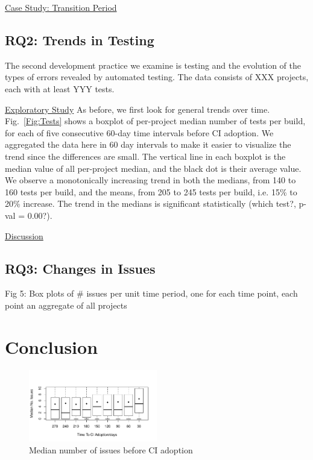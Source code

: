 \documentclass[conference]{IEEEtran}
\begin{document}
\noindent \underline{Case Study: Transition Period}

\subsection{RQ2: Trends in Testing}

The second development practice we examine is testing and the evolution of the types of errors revealed by automated testing.
The data consists of XXX projects, each with at least YYY tests.

\noindent \underline{Exploratory Study} As before, we first look for general trends over time.
Fig.~\ref{Fig:Tests} shows a boxplot of per-project median number of tests per build, for each of five consecutive 60-day time intervals before CI adoption.
We aggregated the data here in 60 day intervals to make it easier to visualize the trend since the differences are small.
The vertical line in each boxplot is the median value of all per-project median, and the black dot is their average value.
We observe a monotonically increasing trend in both the medians, from 140 to 160 tests per build, and the means, from 205 to 245 tests per build, i.e. 15\% to 20\% increase. The trend in the medians is significant statistically (which test?, p-val = 0.00?).


\noindent \underline{Discussion}

\subsection{RQ3: Changes in Issues}

Fig 5: Box plots of \# issues per unit time period, one for each time point, each point an aggregate of all projects






\section{Conclusion}

\begin{figure}[!t]
\centering
\includegraphics[width=0.5\textwidth]{issues_before.pdf}
\caption{Median number of issues before CI adoption}
\label{Fig:IssuesBefore}
\end{figure}
\end{document}
